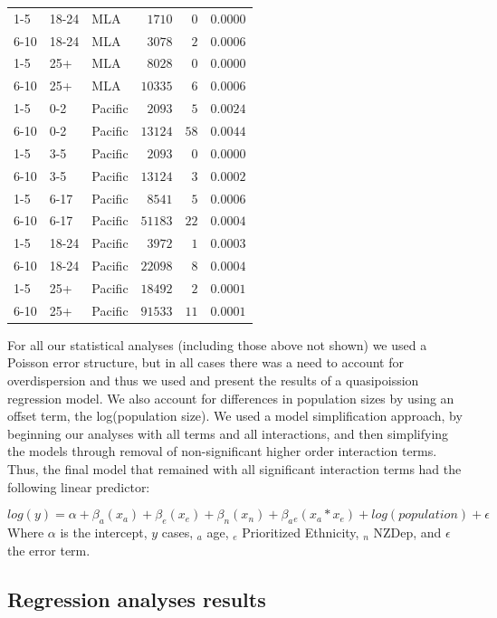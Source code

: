 \documentclass{article}
\begin{document}
\begin{table}
\begin{center}
\begin{tabular}{lllrrr}
1-5&18-24&MLA&$   1710$&$  0$&$0.0000$\tabularnewline
6-10&18-24&MLA&$   3078$&$  2$&$0.0006$\tabularnewline
1-5&25+&MLA&$   8028$&$  0$&$0.0000$\tabularnewline
6-10&25+&MLA&$  10335$&$  6$&$0.0006$\tabularnewline
1-5&0-2&Pacific&$   2093$&$  5$&$0.0024$\tabularnewline
6-10&0-2&Pacific&$  13124$&$ 58$&$0.0044$\tabularnewline
1-5&3-5&Pacific&$   2093$&$  0$&$0.0000$\tabularnewline
6-10&3-5&Pacific&$  13124$&$  3$&$0.0002$\tabularnewline
1-5&6-17&Pacific&$   8541$&$  5$&$0.0006$\tabularnewline
6-10&6-17&Pacific&$  51183$&$ 22$&$0.0004$\tabularnewline
1-5&18-24&Pacific&$   3972$&$  1$&$0.0003$\tabularnewline
6-10&18-24&Pacific&$  22098$&$  8$&$0.0004$\tabularnewline
1-5&25+&Pacific&$  18492$&$  2$&$0.0001$\tabularnewline
6-10&25+&Pacific&$  91533$&$ 11$&$0.0001$\tabularnewline
\hline
\end{tabular}\end{center}\label{table:percap}
\end{table}

For all our statistical analyses (including those above not shown) we used a Poisson error structure, but in all cases there was a need to account for overdispersion and thus we used and present the results of a quasipoission regression model. We also account for differences in population sizes by using an offset term, the log(population size). We used a model simplification approach, by beginning our analyses with all terms and all interactions, and then simplifying the models through removal of non-significant higher order interaction terms. Thus, the final model that remained with all significant interaction terms had the following linear predictor:

\begin{equation} \label{eq:reg}
 log(y) = \alpha + \beta _a (x_a)+ \beta _e(x_e)+ \beta _n (x_n) + \beta _a{}_e(x_a * x_e)+ log(population)  + \epsilon
  \end{equation}
Where $\alpha$ is the intercept, $y$ cases, $_a$ age, $_e$ Prioritized Ethnicity, $_n$ NZDep, and $\epsilon$ the error term.



\subsection{Regression analyses results}
\label{sub:regression_results}
\end{document}
